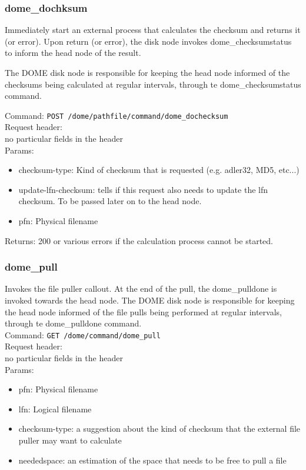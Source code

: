 \documentclass[a4paper,10pt]{scrreprt}
\begin{document}
\subsubsection{dome\_dochksum}
 Immediately start an external process that calculates the checksum and returns it (or error).
 Upon return (or error), the disk node invokes dome\_checksumstatus to inform the head node of the result.

 The DOME disk node is responsible for keeping the head node
 informed of the checksums being calculated at regular intervals,
 through te dome\_checksumstatus command.

Command:
\lstinline"POST /dome/pathfile/command/dome_dochecksum"\\

Request header:\\
no particular fields in the header\\

Params:
\begin{itemize}
 \item checksum-type: Kind of checksum that is requested (e.g. adler32, MD5, etc...)
 \item update-lfn-checksum: tells if this request also needs to update the lfn checksum. To be passed later on to the head node.
 \item pfn: Physical filename
\end{itemize}

Returns: 200 or various errors if the calculation process cannot be started.


\subsubsection{dome\_pull}
 Invokes the file puller callout. At the end of the pull, the dome\_pulldone is invoked towards the head node.
 The DOME disk node is responsible for keeping the head node
 informed of the file pulls being performed at regular intervals,
 through te dome\_pulldone command.\\



Command:
\lstinline"GET /dome/command/dome_pull"\\

Request header:\\
no particular fields in the header\\

Params:
\begin{itemize}
 \item pfn: Physical filename
 \item lfn: Logical filename
 \item checksum-type: a suggestion about the kind of checksum that the external file puller may want to calculate
 \item neededspace: an estimation of the space that needs to be free to pull a file
\end{itemize}
\end{document}
